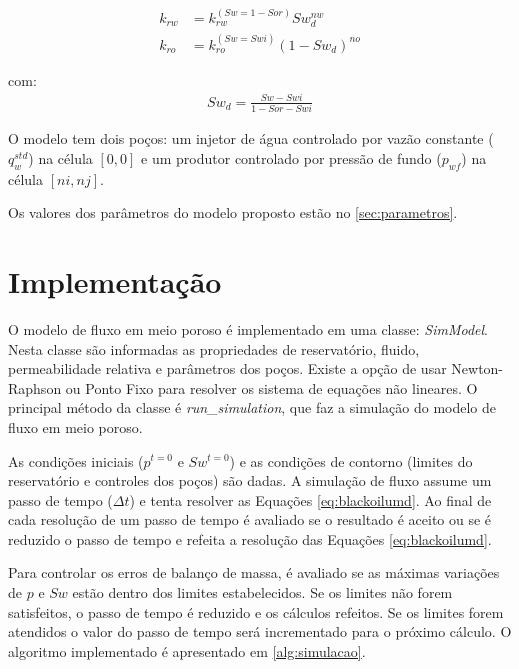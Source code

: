 \documentclass[final,5p]{elsarticle}
\numberwithin{equation}{section}
\begin{document}
        \begin{subequations}
            \begin{align}
                k_{rw} &= k_{rw}^{(Sw=1-Sor)} Sw_d^{nw}  \\
                k_{ro} &= k_{ro}^{(Sw=Swi)} (1-Sw_d)^{no}
            \end{align}
            \label{eq:corey}
        \end{subequations}

        \noindent com:
        \begin{align}
            Sw_d = \frac{Sw - Swi}{1-Sor-Swi} \nonumber
        \end{align}

        O modelo tem dois poços: um injetor de água controlado por vazão constante ($q^{std}_{w}$) na célula $[0,0]$ e um produtor controlado por pressão de fundo ($p_{wf}$) na célula $[ni,nj]$.

        Os valores dos parâmetros do modelo proposto estão no \ref{sec:parametros}.

    \section{Implementação} \label{sec:implementacao}

        O modelo de fluxo em meio poroso é implementado em uma classe: \emph{SimModel}. Nesta classe são informadas as propriedades de reservatório, fluido, permeabilidade relativa e parâmetros dos poços. Existe a opção de usar Newton-Raphson ou Ponto Fixo para resolver os sistema de equações não lineares. O principal método da classe é \emph{run\_simulation}, que faz a simulação do modelo de fluxo em meio poroso.

        As condições iniciais ($p^{t=0}$ e $Sw^{t=0}$) e as condições de contorno (limites do reservatório e controles dos poços) são dadas. A simulação de fluxo assume um passo de tempo ($\Delta t$) e tenta resolver as Equações \ref{eq:blackoilumd}. Ao final de cada resolução de um passo de tempo é avaliado se o resultado é aceito ou se é reduzido o passo de tempo e refeita a resolução das Equações \ref{eq:blackoilumd}.

        Para controlar os erros de balanço de massa, é avaliado se as máximas variações de $p$ e $Sw$ estão dentro dos limites estabelecidos. Se os limites não forem satisfeitos, o passo de tempo é reduzido e os cálculos refeitos. Se os limites forem atendidos o valor do passo de tempo será incrementado para o próximo cálculo. O algoritmo implementado é apresentado em \ref{alg:simulacao}.
\end{document}
